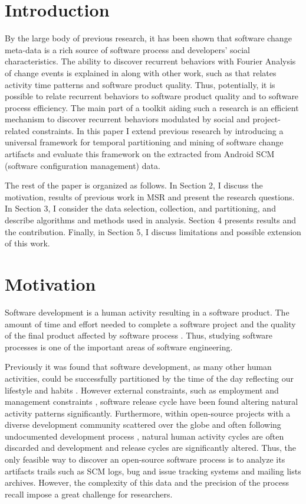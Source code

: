 \documentclass[conference]{worldcomp}
\begin{document}
\section{Introduction}
By the large body of previous research, it has been shown that software change meta-data is a rich 
source of software process and developers' social characteristics. The ability to discover
recurrent behaviors with Fourier Analysis of change events is 
explained in \cite{citeulike:10377345} along with other work, such as \cite{citeulike:10392277}
that relates activity time patterns and software product quality. Thus, potentially,
it is possible to relate recurrent behaviors to software product 
quality and to software process efficiency. The main part of a toolkit
aiding such a research is an efficient mechanism to discover recurrent behaviors
modulated by social and project-related constraints. In this paper I extend 
previous research by introducing a universal framework for temporal 
partitioning and mining of software change artifacts and evaluate this
framework on the extracted from Android SCM (software configuration management) data. 

The rest of the paper is organized as follows. 
In Section 2, I discuss the motivation, results of previous work in MSR and present 
the research questions. 
In Section 3, I consider the data selection, collection, and partitioning, and describe 
algorithms and methods used in analysis. Section 4 presents results and the contribution.
Finally, in Section 5, I discuss limitations and possible extension of this work.

\section{Motivation}
Software development is a human activity resulting in a software product. The 
amount of time and effort needed to complete a software project and the 
quality of the final product affected by software
process \cite{citeulike:9919804}. Thus, studying software processes is one of 
the important areas of software engineering. 

Previously it was found that software development, as many other human activities,
could be successfully partitioned by the time of the day reflecting our lifestyle and habits
\cite{citeulike:10396459} \cite{citeulike:10392305}. However external constraints, 
such as employment and management constraints \cite{citeulike:6095797}, 
software release cycle \cite{citeulike:2739216} have been found altering 
natural activity patterns significantly. Furthermore, within open-source 
projects with a diverse development community scattered over the globe and 
often following undocumented development process \cite{citeulike:10377366}, natural human 
activity cycles are often discarded and development and release cycles are significantly altered.
Thus, the only feasible way to discover an open-source software process is to analyze 
its artifacts trails such as SCM logs, bug and issue tracking systems and 
mailing lists archives. However, the complexity of this data and the precision 
of the process recall impose a great challenge for researchers.
\end{document}
